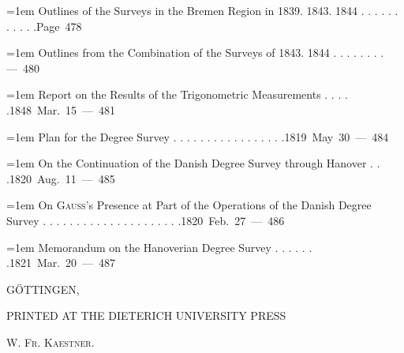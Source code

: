 \par{}%
\begingroup\fontsize{10.5}{13}\selectfont{}
\par\noindent\hangindent=1em Outlines of the Surveys in the Bremen Region in 1839. 1843. 1844 . . . . . . . . . . .\hfill{}\hbox{}\nobreak\hfill\mbox{Page 478}\par
\par\noindent\hangindent=1em Outlines from the Combination of the Surveys of 1843. 1844 . . . . . . . .\hfill{}\hbox{}\nobreak\hfill\mbox{— 480}\par
\par\noindent\hangindent=1em Report on the Results of the Trigonometric Measurements . . . . .\hfill{}\hbox{}\nobreak\hfill\mbox{1848 Mar. 15 — 481}\par
\par\noindent\hangindent=1em Plan for the Degree Survey . . . . . . . . . . . . . . . . .\hfill{}\hbox{}\nobreak\hfill\mbox{1819 May 30 — 484}\par
\par\noindent\hangindent=1em On the Continuation of the Danish Degree Survey through Hanover . . .\hfill{}\hbox{}\nobreak\hfill\mbox{1820 Aug. 11 — 485}\par
\par\noindent\hangindent=1em On \textsc{Gauss}’s Presence at Part of the Operations of the Danish Degree Survey . . . . . . . . . . . . . . . . . . . . .\hfill{}\hbox{}\nobreak\hfill\mbox{1820 Feb. 27 — 486}\par
\par\noindent\hangindent=1em Memorandum on the Hanoverian Degree Survey . . . . . . .\hfill{}\hbox{}\nobreak\hfill\mbox{1821 Mar. 20 — 487}\par
\endgroup
\par\bigskip{}\begin{center}GÖTTINGEN,\par\medskip PRINTED AT THE DIETERICH UNIVERSITY PRESS\par\medskip\textsc{W. Fr. Kaestner.}\end{center}
